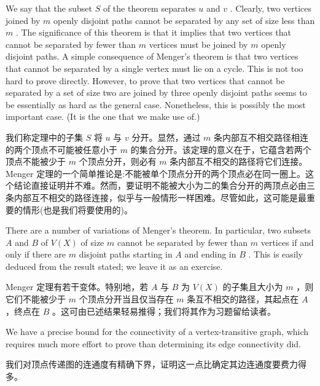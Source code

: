 \documentclass[10pt]{article}
\begin{document}
We say that the subset \(S\) of the theorem separates \(u\) and \(v\) . Clearly, two vertices joined by \(m\) openly disjoint paths cannot be separated by any set of size less than \(m\) . The significance of this theorem is that it implies that two vertices that cannot be separated by fewer than \(m\) vertices must be joined by \(m\) openly disjoint paths. A simple consequence of Menger’s theorem is that two vertices that cannot be separated by a single vertex must lie on a cycle. This is not too hard to prove directly. However, to prove that two vertices that cannot be separated by a set of size two are joined by three openly disjoint paths seems to be essentially as hard as the general case. Nonetheless, this is possibly the most important case. (It is the one that we make use of.)

\begin{tcolorbox}\relax
我们称定理中的子集 \(S\) 将 \(u\) 与 \(v\) 分开。显然，通过 \(m\) 条内部互不相交路径相连的两个顶点不可能被任意小于 \(m\) 的集合分开。该定理的意义在于，它蕴含若两个顶点不能被少于 \(m\) 个顶点分开，则必有 \(m\) 条内部互不相交的路径将它们连接。Menger 定理的一个简单推论是:不能被单个顶点分开的两个顶点必在同一圈上。这个结论直接证明并不难。然而，要证明不能被大小为二的集合分开的两顶点必由三条内部互不相交的路径连接，似乎与一般情形一样困难。尽管如此，这可能是最重要的情形(也是我们将要使用的)。
\end{tcolorbox}

There are a number of variations of Menger's theorem. In particular, two subsets \(A\) and \(B\) of \(V\left( X\right)\) of size \(m\) cannot be separated by fewer than \(m\) vertices if and only if there are \(m\) disjoint paths starting in \(A\) and ending in \(B\) . This is easily deduced from the result stated; we leave it as an exercise.

\begin{tcolorbox}\relax
Menger 定理有若干变体。特别地，若 \(A\) 与 \(B\) 为 \(V\left( X\right)\) 的子集且大小为 \(m\) ，则它们不能被少于 \(m\) 个顶点分开当且仅当存在 \(m\) 条互不相交的路径，其起点在 \(A\) ，终点在 \(B\) 。这可由已述结果轻易推得；我们将其作为习题留给读者。
\end{tcolorbox}

We have a precise bound for the connectivity of a vertex-transitive graph, which requires much more effort to prove than determining its edge connectivity did.

\begin{tcolorbox}\relax
我们对顶点传递图的连通度有精确下界，证明这一点比确定其边连通度要费力得多。
\end{tcolorbox}
\end{document}
